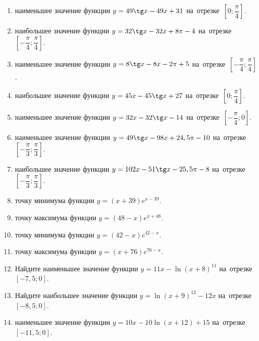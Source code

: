 \documentclass[a4paper,10pt]{article}
\begin{document}
\begin{enumerate}
\item {} наименьшее значение функции $y = 49\tg x-49x+31$ на~отрезке~$\left[0;\dfrac{\pi }{4}\right]$.

\item {} наибольшее значение функции $y=32\tg x-32x+8\pi -4$ на~отрезке~$\left[-\dfrac{\pi }{4};\dfrac{\pi }{4}\right]$.

\item {} наименьшее значение функции $y=8\tg x-8x-2\pi +5$ на~отрезке~$\left[-\dfrac{\pi }{4};\dfrac{\pi }{4}\right]$.

\item {} наибольшее значение функции $y = 45x-45\tg x +27$ на~отрезке~$\left[0;\dfrac{\pi }{4}\right]$.

\item {} наименьшее значение функции $y = 32x-32\tg x -14$ на~отрезке~$\left[-\dfrac{\pi }{4};0\right]$.

\item {} наименьшее значение функции $y = 49\tg x-98x+24,5 \pi -10$ на~отрезке~$\left[-\dfrac{\pi }{3};\dfrac{\pi }{3}\right]$.

\item {} наибольшее значение функции $y = 102x-51\tg x-25,5\pi -8$ на~отрезке~$\left[-\dfrac{\pi }{3};\dfrac{\pi }{3}\right]$.

\item {} точку минимума функции $y = \left(x+39\right)e^{x-39}$.

\item {} точку максимума функции $y = \left(48-x\right)e^{x+48}$.

\item {} точку минимума функции $y = \left(42-x\right)e^{42-x}$.

\item {} точку максимума функции $y = \left(x+76\right)e^{76-x}$.

\item Найдите наименьшее значение функции $y = 11x-\ln \left(x+8\right)^{11}$ на~отрезке~$\left[-7,5;0\right]$.

\item Найдите наибольшее значение функции $y = \ln \left(x+9\right)^{12}-12x$ на~отрезке~$\left[-8,5;0\right]$.

\item {} наименьшее значение функции $y = 10x-10\ln \left(x+12\right) +15$ на~отрезке~$\left[-11,5;0\right]$.


\end{enumerate}
\end{document}
